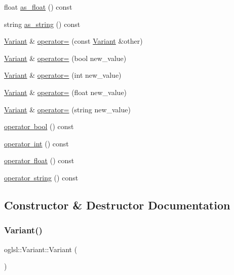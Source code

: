 \begin{DoxyCompactItemize}
\item 
float \mbox{\hyperlink{classoglsl_1_1_variant_a60cbd3a36168f2f4b4d93a765c7edafc}{as\+\_\+float}} () const
\item 
string \mbox{\hyperlink{classoglsl_1_1_variant_a62f24adec68403947a08db9e7a42c458}{as\+\_\+string}} () const
\item 
\mbox{\hyperlink{classoglsl_1_1_variant}{Variant}} \& \mbox{\hyperlink{classoglsl_1_1_variant_aafd03d4fe5aed76e477b9c1c493d7da7}{operator=}} (const \mbox{\hyperlink{classoglsl_1_1_variant}{Variant}} \&other)
\item 
\mbox{\hyperlink{classoglsl_1_1_variant}{Variant}} \& \mbox{\hyperlink{classoglsl_1_1_variant_a69ee102989142f60a760785b7610d3ac}{operator=}} (bool new\+\_\+value)
\item 
\mbox{\hyperlink{classoglsl_1_1_variant}{Variant}} \& \mbox{\hyperlink{classoglsl_1_1_variant_aefcbba97a5c59aba0aaac2b36e70e3e3}{operator=}} (int new\+\_\+value)
\item 
\mbox{\hyperlink{classoglsl_1_1_variant}{Variant}} \& \mbox{\hyperlink{classoglsl_1_1_variant_a6343065fd630b414ec29578c981c0859}{operator=}} (float new\+\_\+value)
\item 
\mbox{\hyperlink{classoglsl_1_1_variant}{Variant}} \& \mbox{\hyperlink{classoglsl_1_1_variant_a7e429221bddc63d4dd1913d057a68c6c}{operator=}} (string new\+\_\+value)
\item 
\mbox{\hyperlink{classoglsl_1_1_variant_af52c432aaf8fd2b41b1f0bc8c60daaa8}{operator bool}} () const
\item 
\mbox{\hyperlink{classoglsl_1_1_variant_a901e24dc44ebebaacf0d9c0ee64528a7}{operator int}} () const
\item 
\mbox{\hyperlink{classoglsl_1_1_variant_a8c0eb7364db9e1bbec5f2541bae92a92}{operator float}} () const
\item 
\mbox{\hyperlink{classoglsl_1_1_variant_ac47c31403ca1d9770ad683b1cdaa42ef}{operator string}} () const
\end{DoxyCompactItemize}


\subsection{Constructor \& Destructor Documentation}
\mbox{\label{classoglsl_1_1_variant_ad39fba162540f53ea88414afd6671c9c}} 
\subsubsection{\texorpdfstring{Variant()}{Variant()}\hspace{0.1cm}{\footnotesize\ttfamily [1/5]}}
{\footnotesize\ttfamily oglsl\+::\+Variant\+::\+Variant (\begin{DoxyParamCaption}{ }\end{DoxyParamCaption})\hspace{0.3cm}{\ttfamily [inline]}}


